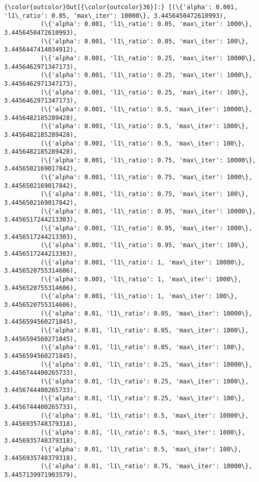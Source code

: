 \documentclass[11pt]{article}
\begin{document}
            \begin{Verbatim}[commandchars=\\\{\}]
{\color{outcolor}Out[{\color{outcolor}36}]:} [(\{'alpha': 0.001, 'l1\_ratio': 0.05, 'max\_iter': 10000\}, 3.4456450472610993),
          (\{'alpha': 0.001, 'l1\_ratio': 0.05, 'max\_iter': 1000\}, 3.4456450472610993),
          (\{'alpha': 0.001, 'l1\_ratio': 0.05, 'max\_iter': 100\}, 3.4456447414034912),
          (\{'alpha': 0.001, 'l1\_ratio': 0.25, 'max\_iter': 10000\}, 3.4456462971347173),
          (\{'alpha': 0.001, 'l1\_ratio': 0.25, 'max\_iter': 1000\}, 3.4456462971347173),
          (\{'alpha': 0.001, 'l1\_ratio': 0.25, 'max\_iter': 100\}, 3.4456462971347173),
          (\{'alpha': 0.001, 'l1\_ratio': 0.5, 'max\_iter': 10000\}, 3.4456482185289428),
          (\{'alpha': 0.001, 'l1\_ratio': 0.5, 'max\_iter': 1000\}, 3.4456482185289428),
          (\{'alpha': 0.001, 'l1\_ratio': 0.5, 'max\_iter': 100\}, 3.4456482185289428),
          (\{'alpha': 0.001, 'l1\_ratio': 0.75, 'max\_iter': 10000\}, 3.4456502169017842),
          (\{'alpha': 0.001, 'l1\_ratio': 0.75, 'max\_iter': 1000\}, 3.4456502169017842),
          (\{'alpha': 0.001, 'l1\_ratio': 0.75, 'max\_iter': 100\}, 3.4456502169017842),
          (\{'alpha': 0.001, 'l1\_ratio': 0.95, 'max\_iter': 10000\}, 3.4456517244213303),
          (\{'alpha': 0.001, 'l1\_ratio': 0.95, 'max\_iter': 1000\}, 3.4456517244213303),
          (\{'alpha': 0.001, 'l1\_ratio': 0.95, 'max\_iter': 100\}, 3.4456517244213303),
          (\{'alpha': 0.001, 'l1\_ratio': 1, 'max\_iter': 10000\}, 3.4456520755314606),
          (\{'alpha': 0.001, 'l1\_ratio': 1, 'max\_iter': 1000\}, 3.4456520755314606),
          (\{'alpha': 0.001, 'l1\_ratio': 1, 'max\_iter': 100\}, 3.4456520755314606),
          (\{'alpha': 0.01, 'l1\_ratio': 0.05, 'max\_iter': 10000\}, 3.4456594560271845),
          (\{'alpha': 0.01, 'l1\_ratio': 0.05, 'max\_iter': 1000\}, 3.4456594560271845),
          (\{'alpha': 0.01, 'l1\_ratio': 0.05, 'max\_iter': 100\}, 3.4456594560271845),
          (\{'alpha': 0.01, 'l1\_ratio': 0.25, 'max\_iter': 10000\}, 3.4456744400265733),
          (\{'alpha': 0.01, 'l1\_ratio': 0.25, 'max\_iter': 1000\}, 3.4456744400265733),
          (\{'alpha': 0.01, 'l1\_ratio': 0.25, 'max\_iter': 100\}, 3.4456744400265733),
          (\{'alpha': 0.01, 'l1\_ratio': 0.5, 'max\_iter': 10000\}, 3.4456935748379318),
          (\{'alpha': 0.01, 'l1\_ratio': 0.5, 'max\_iter': 1000\}, 3.4456935748379318),
          (\{'alpha': 0.01, 'l1\_ratio': 0.5, 'max\_iter': 100\}, 3.4456935748379318),
          (\{'alpha': 0.01, 'l1\_ratio': 0.75, 'max\_iter': 10000\}, 3.4457139971903579),

\end{Verbatim}
\end{document}
